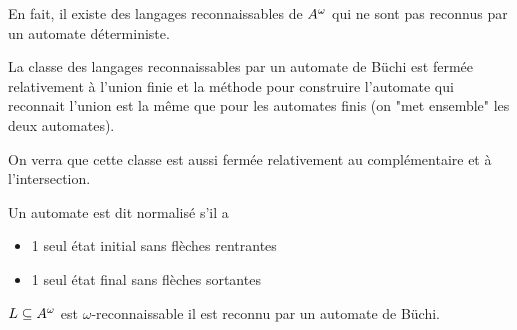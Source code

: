 En fait, il existe des langages reconnaissables de $A^{\omega}$ qui ne sont pas reconnus par un automate déterministe.



La classe des langages reconnaissables par un automate de Büchi est fermée relativement à l'union finie
et la méthode pour construire l'automate qui reconnait l'union est la même que pour les automates finis (on "met ensemble"
les deux automates).

On verra que cette classe est aussi fermée relativement au complémentaire et à l'intersection.


\begin{definition}
	Un automate est dit normalisé s'il a

	\begin{itemize}
		\item 1 seul état initial sans flèches rentrantes
		\item 1 seul état final sans flèches sortantes
	\end{itemize}
\end{definition}

\begin{theorem}
	$L \subseteq A^{\omega}$ est $\omega$-reconnaissable \ssi il est reconnu par un automate de Büchi.
\end{theorem}

